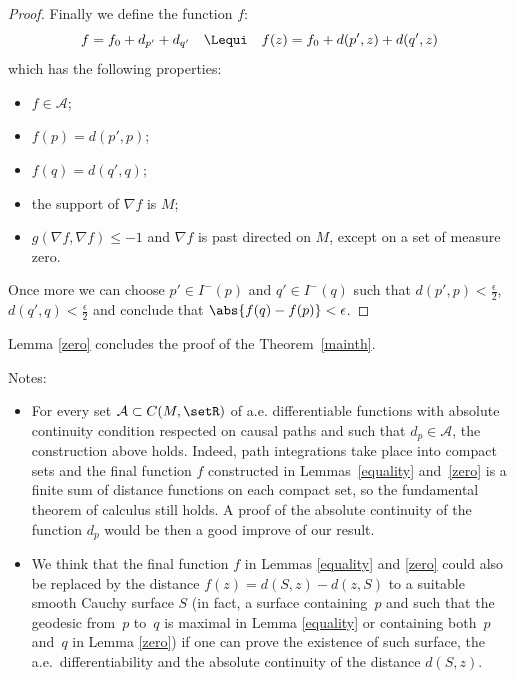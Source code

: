 \begin{proof}
Finally we def\/ine the function $f$:
\[
f = f_0 + d_{p'} + d_{q'}  \quad \Lequi \quad   f(z) = f_0 + d(p',z) + d(q',z)
\]
which has the following properties:
\begin{itemize}\itemsep=0pt
\item $f\in\mathcal A$;
\item $f(p)= d(p',p)$;
\item $f(q)= d(q',q)$;
\item the support of $\nabla f$ is $M$;
\item $g( \nabla f, \nabla f) \leq -1$ and $\nabla f$ is past directed on $M$, except on a set of measure zero.
\end{itemize}

Once more we can choose $p' \in I^-(p)$ and $q' \in I^-(q)$ such that $d(p',p) < \frac\epsilon2$, $d(q',q) < \frac\epsilon2$ and conclude that $\abs{f(q)-f(p)} < \epsilon$.
\end{proof}

Lemma \ref{zero} concludes the proof of the Theorem~\ref{mainth}.

Notes:
\begin{itemize}\itemsep=0pt
\item For every set $\mathcal A \subset C(M,\setR)$ of a.e. dif\/ferentiable functions with absolute continuity condition respected on causal paths and such that $d_p \in \mathcal A$, the construction above holds. Indeed, path integrations take place into compact sets and the f\/inal function $f$ constructed in Lemmas~\ref{equality} and~\ref{zero} is a f\/inite sum of distance functions on each compact set, so the fundamental theorem of calculus still holds. A proof of the absolute continuity of the function $d_p$ would be then a good improve of our result.
\item We think that the f\/inal function $f$ in Lemmas \ref{equality} and \ref{zero} could also be replaced by the distance $f(z) = d(S,z) - d(z,S)$ to a suitable smooth Cauchy surface $S$ (in fact, a surface containing~$p$ and such that the geodesic from~$p$ to~$q$ is maximal in Lemma \ref{equality} or con\-taining both~$p$ and~$q$ in Lemma \ref{zero}) if one can prove the existence of such surface, the a.e.\ dif\/ferentiability and the absolute continuity of the distance $d(S,z)$.
\end{itemize}



